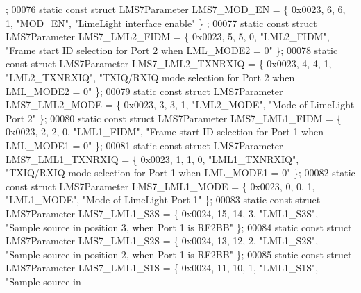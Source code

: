 \begin{DoxyCode}
      ;
00076 \textcolor{keyword}{static} \textcolor{keyword}{const} \textcolor{keyword}{struct }LMS7Parameter LMS7_MOD_EN = \{ 0x0023, 6, 6, 1, \textcolor{stringliteral}{"MOD\_EN"}, \textcolor{stringliteral}{"LimeLight interface enable"} \}
      ;
00077 \textcolor{keyword}{static} \textcolor{keyword}{const} \textcolor{keyword}{struct }LMS7Parameter LMS7_LML2_FIDM = \{ 0x0023, 5, 5, 0, \textcolor{stringliteral}{"LML2\_FIDM"}, \textcolor{stringliteral}{"Frame start ID
       selection for Port 2 when LML\_MODE2 = 0"} \};
00078 \textcolor{keyword}{static} \textcolor{keyword}{const} \textcolor{keyword}{struct }LMS7Parameter LMS7_LML2_TXNRXIQ = \{ 0x0023, 4, 4, 1, \textcolor{stringliteral}{"LML2\_TXNRXIQ"}, \textcolor{stringliteral}{"TXIQ/RXIQ mode
       selection for Port 2 when LML\_MODE2 = 0"} \};
00079 \textcolor{keyword}{static} \textcolor{keyword}{const} \textcolor{keyword}{struct }LMS7Parameter LMS7_LML2_MODE = \{ 0x0023, 3, 3, 1, \textcolor{stringliteral}{"LML2\_MODE"}, \textcolor{stringliteral}{"Mode of LimeLight Port
       2"} \};
00080 \textcolor{keyword}{static} \textcolor{keyword}{const} \textcolor{keyword}{struct }LMS7Parameter LMS7_LML1_FIDM = \{ 0x0023, 2, 2, 0, \textcolor{stringliteral}{"LML1\_FIDM"}, \textcolor{stringliteral}{"Frame start ID
       selection for Port 1 when LML\_MODE1 = 0"} \};
00081 \textcolor{keyword}{static} \textcolor{keyword}{const} \textcolor{keyword}{struct }LMS7Parameter LMS7_LML1_TXNRXIQ = \{ 0x0023, 1, 1, 0, \textcolor{stringliteral}{"LML1\_TXNRXIQ"}, \textcolor{stringliteral}{"TXIQ/RXIQ mode
       selection for Port 1 when LML\_MODE1 = 0"} \};
00082 \textcolor{keyword}{static} \textcolor{keyword}{const} \textcolor{keyword}{struct }LMS7Parameter LMS7_LML1_MODE = \{ 0x0023, 0, 0, 1, \textcolor{stringliteral}{"LML1\_MODE"}, \textcolor{stringliteral}{"Mode of LimeLight Port
       1"} \};
00083 \textcolor{keyword}{static} \textcolor{keyword}{const} \textcolor{keyword}{struct }LMS7Parameter LMS7_LML1_S3S = \{ 0x0024, 15, 14, 3, \textcolor{stringliteral}{"LML1\_S3S"}, \textcolor{stringliteral}{"Sample source in
       position 3, when Port 1 is RF2BB"} \};
00084 \textcolor{keyword}{static} \textcolor{keyword}{const} \textcolor{keyword}{struct }LMS7Parameter LMS7_LML1_S2S = \{ 0x0024, 13, 12, 2, \textcolor{stringliteral}{"LML1\_S2S"}, \textcolor{stringliteral}{"Sample source in
       position 2, when Port 1 is RF2BB"} \};
00085 \textcolor{keyword}{static} \textcolor{keyword}{const} \textcolor{keyword}{struct }LMS7Parameter LMS7_LML1_S1S = \{ 0x0024, 11, 10, 1, \textcolor{stringliteral}{"LML1\_S1S"}, \textcolor{stringliteral}{"Sample source in
}
\end{DoxyCode}
